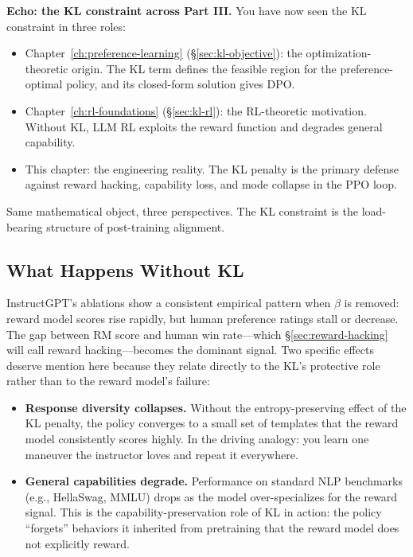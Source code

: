 \begin{tcolorbox}[colback=gray!8, colframe=gray!40]
\textbf{Echo: the KL constraint across Part III.}
You have now seen the KL constraint in three roles:
\begin{itemize}[nosep]
  \item Chapter~\ref{ch:preference-learning} (\S\ref{sec:kl-objective}): the optimization-theoretic origin. The KL term defines the feasible region for the preference-optimal policy, and its closed-form solution gives DPO.
  \item Chapter~\ref{ch:rl-foundations} (\S\ref{sec:kl-rl}): the RL-theoretic motivation. Without KL, LLM RL exploits the reward function and degrades general capability.
  \item This chapter: the engineering reality. The KL penalty is the primary defense against reward hacking, capability loss, and mode collapse in the PPO loop.
\end{itemize}
Same mathematical object, three perspectives. The KL constraint is the load-bearing structure of post-training alignment.
\end{tcolorbox}

\subsection{What Happens Without KL}

InstructGPT's ablations show a consistent empirical pattern when $\beta$ is removed: reward model scores rise rapidly, but human preference ratings stall or decrease. The gap between RM score and human win rate---which \S\ref{sec:reward-hacking} will call reward hacking---becomes the dominant signal. Two specific effects deserve mention here because they relate directly to the KL's protective role rather than to the reward model's failure:

\begin{itemize}[nosep]
  \item \textbf{Response diversity collapses.} Without the entropy-preserving effect of the KL penalty, the policy converges to a small set of templates that the reward model consistently scores highly. In the driving analogy: you learn one maneuver the instructor loves and repeat it everywhere.
  \item \textbf{General capabilities degrade.} Performance on standard NLP benchmarks (e.g., HellaSwag, MMLU) drops as the model over-specializes for the reward signal. This is the capability-preservation role of KL in action: the policy ``forgets'' behaviors it inherited from pretraining that the reward model does not explicitly reward.
\end{itemize}

